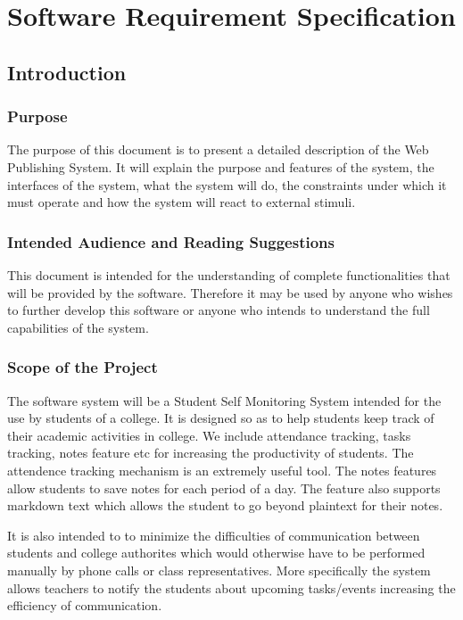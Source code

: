 \section{Software Requirement Specification}

\subsection{Introduction}

\subsubsection{Purpose}
The purpose of this document is to present a detailed description of the Web Publishing System. It will explain the purpose and features of the system, the interfaces of the system, what the system will do, the constraints under which it must operate and how the system will react to external stimuli.

\subsubsection{Intended Audience and Reading Suggestions}
This document is intended for the understanding of complete functionalities that will be provided by the software. Therefore it may be used by anyone who wishes to further develop this software or anyone who intends to understand the full capabilities of the system.

\subsubsection{Scope of the Project}
The software system will be a Student Self Monitoring System intended for the use by students of a college. It is designed so as to help students keep track of their academic activities in college. We include attendance tracking, tasks tracking, notes feature etc for increasing the productivity of students. The attendence tracking mechanism is an extremely useful tool. The notes features allow students to save notes for each period of a day. The feature also supports markdown text which allows the student to go beyond plaintext for their notes.

It is also intended to to minimize the difficulties of communication between students and college authorites which would otherwise have to be performed manually by phone calls or class representatives. More specifically the system allows teachers to notify the students about upcoming tasks/events increasing the efficiency of communication.

